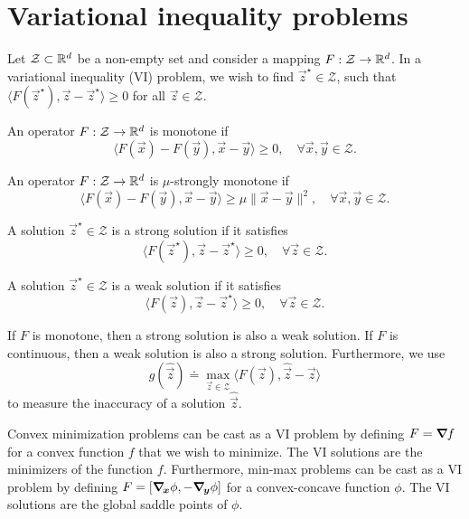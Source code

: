 \section{Variational inequality problems}

Let $\mathcal{Z} \subset \mathbb{R}^d$ be a non-empty set and consider a mapping $F: \mathcal{Z} \to \mathbb{R}^d$.
In a variational inequality (VI) problem, we wish to find $\vec{z}^\star \in \mathcal{Z}$, such
that $\langle F(\vec{z}^\star), \vec{z} - \vec{z}^\star \rangle \geq 0$ for all $\vec{z} \in
    \mathcal{Z}$.

\begin{definition}
    An operator $F: \mathcal{Z} \to \mathbb{R}^d$ is monotone if \[
        \langle F(\vec{x}) - F(\vec{y}), \vec{x} - \vec{y} \rangle \geq 0, \quad \forall \vec{x}, \vec{y} \in \mathcal{Z}.
    \]
\end{definition}

\begin{definition}
    An operator $F: \mathcal{Z} \to \mathbb{R}^d$ is $\mu$-strongly monotone if \[
        \langle F(\vec{x}) - F(\vec{y}), \vec{x} - \vec{y} \rangle \geq \mu \| \vec{x} - \vec{y} \|^2, \quad \forall \vec{x}, \vec{y} \in \mathcal{Z}.
    \]
\end{definition}

\begin{definition}
    A solution $\vec{z}^\star \in \mathcal{Z}$ is a strong solution if it satisfies \[
        \langle F(\vec{z}^\star), \vec{z} - \vec{z}^\star \rangle \geq 0, \quad \forall \vec{z} \in \mathcal{Z}.
    \]
\end{definition}

\begin{definition}
    A solution $\vec{z}^\star \in \mathcal{Z}$ is a weak solution if it satisfies \[
        \langle F(\vec{z}), \vec{z} - \vec{z}^\star \rangle \geq 0, \quad \forall \vec{z} \in \mathcal{Z}.
    \]
\end{definition}

If $F$ is monotone, then a strong solution is also a weak solution. If $F$ is continuous, then a
weak solution is also a strong solution. Furthermore, we use \[
    g(\hat{\vec{z}}) \doteq \max_{\vec{z} \in \mathcal{Z}} \langle F(\vec{z}), \hat{\vec{z}} - \vec{z} \rangle
\]
to measure the inaccuracy of a solution $\hat{\vec{z}}$.

Convex minimization problems can be cast as a VI problem by defining $F = \bm{\nabla}_{\! } f$ for a convex
function $f$ that we wish to minimize. The VI solutions are the minimizers of the function $f$.
Furthermore, min-max problems can be cast as a VI problem by defining $F = [\bm{\nabla}_{\! \bm{x}} \phi,
    -\bm{\nabla}_{\! \bm{y}} \phi]$ for a convex-concave function $\phi$. The VI solutions are the global
saddle points of $\phi$.

